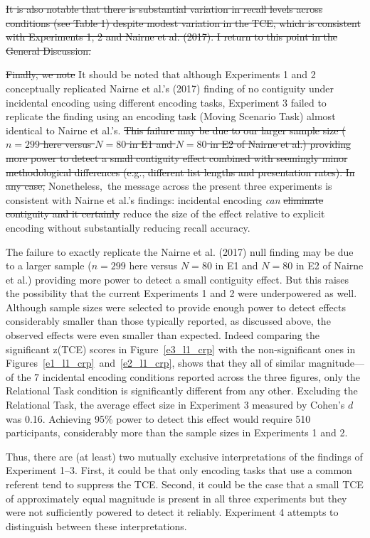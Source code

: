 \documentclass[man,natbib,floatsintext]{apa6} %
\begin{document}
\st{It is also notable that there is substantial variation in recall levels across conditions (see Table 1) despite modest variation in the TCE, which is consistent with Experiments 1, 2 and Nairne et al. (2017). I return to this point in the General Discussion.}

\st{Finally, we note} \color{red}It should be noted \color{black} that although Experiments 1 and 2 conceptually replicated Nairne et al.'s (2017) finding of no contiguity under incidental encoding using different encoding tasks, Experiment 3 failed to replicate the finding using an encoding task (Moving Scenario Task) almost identical to Nairne et al.'s. \st{This failure may be due to our larger sample size ($n=299$ here versus $N=80$ in E1 and $N=80$ in E2 of Nairne et al.) providing more power to detect a small contiguity effect combined with seemingly minor methodological differences (e.g., different list lengths and presentation rates). In any case,} \color{red}Nonetheless,\color{black}~the message across the present three experiments is consistent with Nairne et al.'s findings: incidental encoding \emph{can} \st{eliminate contiguity and it certainly} reduce the size of the effect relative to explicit encoding \color{red} without substantially reducing recall accuracy\color{black}.

\color{red}
The failure to exactly replicate the Nairne et al. (2017) null finding may be due to a larger sample ($n=299$ here versus $N=80$ in E1 and $N=80$ in E2 of Nairne et al.) providing more power to detect a small contiguity effect. But this raises the possibility that the current Experiments 1 and 2 were underpowered as well. Although sample sizes were selected to provide enough power to detect effects considerably smaller than those typically reported, as discussed above, the observed effects were even smaller than expected. Indeed comparing the significant z(TCE) scores in Figure~\ref{e3_l1_crp} with the non-significant ones in Figures~\ref{e1_l1_crp}~and~\ref{e2_l1_crp}, shows that they all of similar magnitude---of the 7 incidental encoding conditions reported across the three figures, only the Relational Task condition is significantly different from any other. \label{power}Excluding the Relational Task, the average effect size in Experiment 3 measured by Cohen's $d$ was 0.16. Achieving 95\% power to detect this effect would require 510 participants, considerably more than the sample sizes in Experiments 1 and 2.

Thus, there are (at least) two mutually exclusive interpretations of the findings of Experiment 1--3. First, it could be that only encoding tasks that use a common referent tend to suppress the TCE. Second, it could be the case that a small TCE of approximately equal magnitude is present in all three experiments but they were not sufficiently powered to detect it reliably. Experiment 4 attempts to distinguish between these interpretations.
\end{document}
